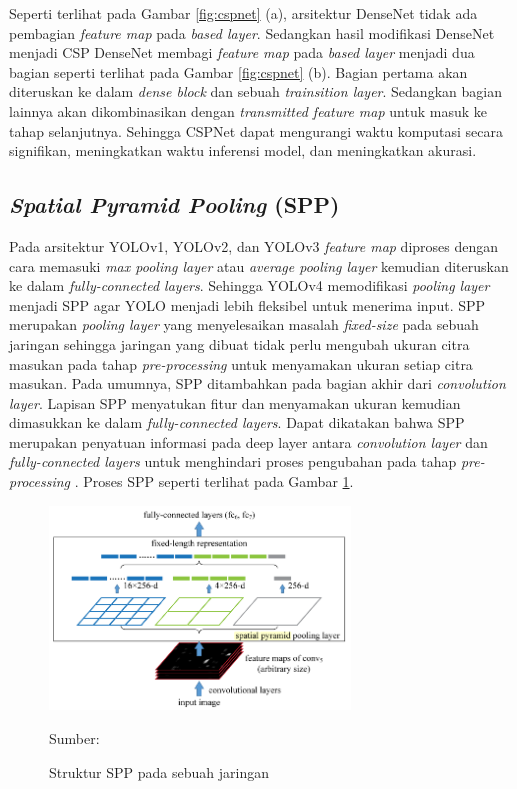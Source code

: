     Seperti terlihat pada Gambar \ref{fig:cspnet} (a), arsitektur DenseNet tidak ada pembagian \textit{feature map} pada \textit{based layer}. Sedangkan hasil modifikasi DenseNet menjadi CSP DenseNet membagi \textit{feature map} pada \textit{based layer} menjadi dua bagian seperti terlihat pada Gambar \ref{fig:cspnet} (b). Bagian pertama akan diteruskan ke dalam \textit{dense block} dan sebuah \textit{trainsition layer}. Sedangkan bagian lainnya akan dikombinasikan dengan \textit{transmitted feature map} untuk masuk ke tahap selanjutnya. Sehingga CSPNet dapat mengurangi waktu komputasi secara signifikan, meningkatkan waktu inferensi model, dan meningkatkan akurasi.

    \subsection{\textit{Spatial Pyramid Pooling} (SPP)}
    Pada arsitektur YOLOv1, YOLOv2, dan YOLOv3 \textit{feature map} diproses dengan cara memasuki \textit{max pooling layer} atau \textit{average pooling layer} kemudian diteruskan ke dalam \textit{fully-connected layers}. Sehingga YOLOv4 memodifikasi \textit{pooling layer} menjadi SPP agar YOLO menjadi lebih fleksibel untuk menerima input. SPP merupakan \textit{pooling layer} yang menyelesaikan masalah \textit{fixed-size} pada sebuah jaringan sehingga jaringan yang dibuat tidak perlu mengubah ukuran citra masukan pada tahap \textit{pre-processing} untuk menyamakan ukuran setiap citra masukan. Pada umumnya, SPP ditambahkan pada bagian akhir dari \textit{convolution layer}. Lapisan SPP menyatukan fitur dan menyamakan ukuran kemudian dimasukkan ke dalam \textit{fully-connected layers}. Dapat dikatakan bahwa SPP merupakan penyatuan informasi pada deep layer antara \textit{convolution layer} dan \textit{fully-connected layers} untuk menghindari proses pengubahan pada tahap \textit{pre-processing} \citep{He2014}. Proses SPP seperti terlihat pada Gambar \ref{fig:spatial-pyramid-pooling}.

    \begin{figure}[H]
        \begin{center}
            \includegraphics[width=8cm]{../img/Spatial Pyramid Pooling - Latex.png}
            \caption{Struktur SPP pada sebuah jaringan}
            \label{fig:spatial-pyramid-pooling}
            Sumber: \citep{He2014}
        \end{center}
    \end{figure}

